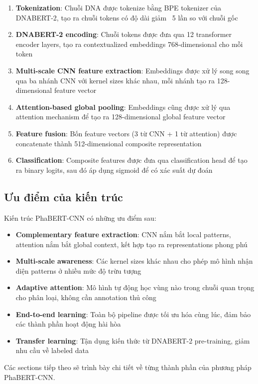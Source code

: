 \begin{enumerate}
    \item \textbf{Tokenization}: Chuỗi DNA được tokenize bằng BPE tokenizer của DNABERT-2, tạo ra chuỗi tokens có độ dài giảm ~5 lần so với chuỗi gốc

    \item \textbf{DNABERT-2 encoding}: Chuỗi tokens được đưa qua 12 transformer encoder layers, tạo ra contextualized embeddings 768-dimensional cho mỗi token

    \item \textbf{Multi-scale CNN feature extraction}: Embeddings được xử lý song song qua ba nhánh CNN với kernel sizes khác nhau, mỗi nhánh tạo ra 128-dimensional feature vector

    \item \textbf{Attention-based global pooling}: Embeddings cũng được xử lý qua attention mechanism để tạo ra 128-dimensional global feature vector

    \item \textbf{Feature fusion}: Bốn feature vectors (3 từ CNN + 1 từ attention) được concatenate thành 512-dimensional composite representation

    \item \textbf{Classification}: Composite features được đưa qua classification head để tạo ra binary logits, sau đó áp dụng sigmoid để có xác suất dự đoán
\end{enumerate}

\subsection{Ưu điểm của kiến trúc}

Kiến trúc PhaBERT-CNN có những ưu điểm sau:

\begin{itemize}
    \item \textbf{Complementary feature extraction}: CNN nắm bắt local patterns, attention nắm bắt global context, kết hợp tạo ra representations phong phú

    \item \textbf{Multi-scale awareness}: Các kernel sizes khác nhau cho phép mô hình nhận diện patterns ở nhiều mức độ trừu tượng

    \item \textbf{Adaptive attention}: Mô hình tự động học vùng nào trong chuỗi quan trọng cho phân loại, không cần annotation thủ công

    \item \textbf{End-to-end learning}: Toàn bộ pipeline được tối ưu hóa cùng lúc, đảm bảo các thành phần hoạt động hài hòa

    \item \textbf{Transfer learning}: Tận dụng kiến thức từ DNABERT-2 pre-training, giảm nhu cầu về labeled data
\end{itemize}

Các sections tiếp theo sẽ trình bày chi tiết về từng thành phần của phương pháp PhaBERT-CNN.
